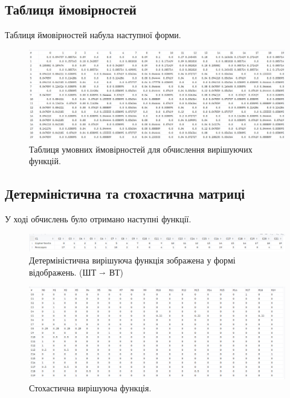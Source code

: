\subsection{Таблиця ймовірностей}
Таблиця ймовірностей набула наступної форми.

\begin{figure}[h]
    \centering
    \includegraphics[scale = 0.25]{Images/conditional_prob}
    \caption{Таблиця умовних ймовірностей для обчислення вирішуючих функцій.}
    \label{fig:twisted_edward}
\end{figure}


\subsection{Детерміністична та стохастична матриці}
У ході обчислень було отримано наступні функції.

\begin{figure}[h]
    \centering
    \includegraphics[scale = 0.34]{Images/deterministic}
    \caption{Детерміністична вирішуюча функція зображена у формі відображень. (ШТ $\shortrightarrow$ ВТ) }
    \label{fig:twisted_edward}
\end{figure}

\begin{figure}[h]
    \centering
    \includegraphics[scale = 0.3]{Images/stochastic}
    \caption{Стохастична вирішуюча функція.}
    \label{fig:twisted_edward}
\end{figure}

